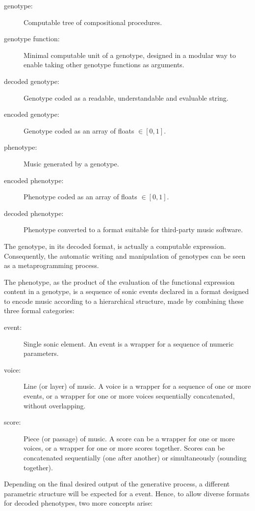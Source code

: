 \documentclass{article}
\begin{document}
\begin{description}
\item[genotype:] Computable tree of compositional procedures.
\item[genotype function:] Minimal computable unit of a genotype, designed in a modular way to enable taking other genotype functions as arguments. 
\item[decoded genotype:] Genotype coded as a readable, understandable and evaluable string.
\item[encoded genotype:] Genotype coded as an array of floats $\in [0, 1]$.
\item[phenotype:] Music generated by a genotype.
\item[encoded phenotype:] Phenotype coded as an array of floats $\in [0, 1]$.
\item[decoded phenotype:] Phenotype converted to a format suitable for third-party music software.
\end{description}

The {genotype}, in its decoded format, is actually a computable expression. Consequently, the automatic writing and manipulation of genotypes can be seen as a metaprogramming process.

The {phenotype}, as the product of the evaluation of the functional expression content in a genotype, is a sequence of sonic events declared in a format designed to encode music according to a hierarchical structure, made by combining these three formal categories:

\begin{description}
\item[event:] Single sonic element. An event is a wrapper for a sequence of numeric parameters.
\item[voice:] Line (or layer) of music. A voice is a wrapper for a sequence of one or more events, or a wrapper for one or more voices sequentially concatenated, without overlapping.
\item[score:] Piece (or passage) of music. A score can be a wrapper for one or more voices, or a wrapper for one or more scores together. Scores can be concatenated sequentially (one after another) or simultaneously (sounding together).
\end{description}

Depending on the final desired output of the generative process, a different parametric structure will be expected for a event. Hence, to allow diverse formats for decoded phenotypes, two more concepts arise:  
\end{document}
